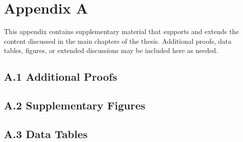 \chapter*{Appendix A}

This appendix contains supplementary material that supports and extends the content discussed in the main chapters of the thesis. Additional proofs, data tables, figures, or extended discussions may be included here as needed.

\section*{A.1 Additional Proofs}


\section*{A.2 Supplementary Figures}


\section*{A.3 Data Tables}


